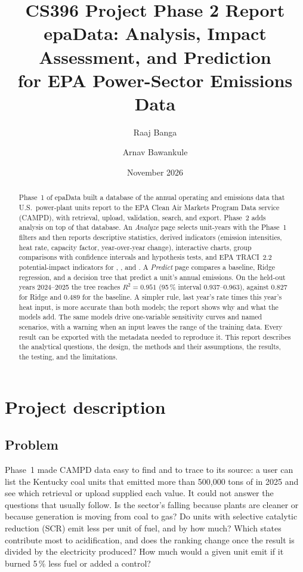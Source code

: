 \documentclass[11pt,a4paper]{article}
\title{%
  \vspace*{-1em}
  {\Large CS396 Project Phase 2 Report}\\[0.8em]
  \textbf{epaData}: Analysis, Impact Assessment, and Prediction\\for EPA Power-Sector Emissions Data}
\author{Raaj Banga \and Arnav Bawankule}
\date{November 2026}
\begin{document}
\maketitle

\begin{abstract}
\noindent
Phase~1 of epaData built a database of the annual operating and emissions data that U.S.\
power-plant units report to the EPA Clean Air Markets Program Data service (CAMPD), with
retrieval, upload, validation, search, and export. Phase~2 adds analysis on top of that
database. An \emph{Analyze} page selects unit-years with the Phase~1 filters and then reports
descriptive statistics, derived indicators (emission intensities, heat rate, capacity factor,
year-over-year change), interactive charts, group comparisons with confidence intervals and
hypothesis tests, and EPA TRACI~2.2 potential-impact indicators for \COtwo{}, \SOtwo{}, and
\NOx{}. A \emph{Predict} page compares a baseline, Ridge regression, and a decision tree that
predict a unit's annual \NOx{} emissions. On the held-out years 2024--2025 the tree reaches
$R^2 = 0.951$ (95\,\% interval 0.937--0.963), against $0.827$ for Ridge and $0.489$ for the
baseline. A simpler rule, last year's \NOx{} rate times this year's heat input, is more accurate
than both models; the report shows why and what the models add. The same models drive
one-variable sensitivity curves and named scenarios, with a warning when an input leaves the
range of the training data. Every result can be exported with the metadata needed to reproduce
it. This report describes the analytical questions, the design, the methods and their
assumptions, the results, the testing, and the limitations.
\end{abstract}

\tableofcontents
\newpage

\section{Project description}
\label{sec:description}

\subsection{Problem}

Phase~1 made CAMPD data easy to find and to trace to its source: a user can list the Kentucky
coal units that emitted more than 500{,}000 tons of \COtwo{} in 2025 and see which retrieval or
upload supplied each value. It could not answer the questions that usually follow. Is the
sector's \COtwo{} falling because plants are cleaner or because generation is moving from coal
to gas? Do units with selective catalytic reduction (SCR) emit less \NOx{} per unit of fuel, and
by how much? Which states contribute most to acidification, and does the ranking change once
the result is divided by the electricity produced? How much \NOx{} would a given unit emit if it
burned 5\,\% less fuel or added a control?
\end{document}

